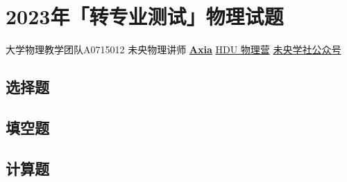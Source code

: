 \chapter{2023年「转专业测试」物理试题}
\date{2023年12月3日}{大学物理教学团队}{A0715012}
{未央物理讲师 \href{https://qm.qq.com/q/UPbGudx8cK}{\textbf{Axia}}}
{}{\href{https://qm.qq.com/q/asJiytD5pC}{HDU 物理营}}
{}{\href{http://weixin.qq.com/r/mhKYgFTEMQlOrRDj90eI}{未央学社公众号}}
\section{选择题}
\section{填空题}
\section{计算题}